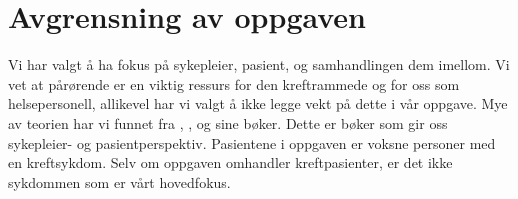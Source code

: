 \section{Avgrensning av oppgaven}

Vi har valgt å ha fokus på sykepleier, pasient, og samhandlingen dem imellom.
Vi vet at pårørende er en viktig ressurs for den kreftrammede og for oss som
helsepersonell, allikevel har vi valgt å ikke legge vekt på dette i vår
oppgave. Mye av teorien har vi funnet fra ,
,  og  sine bøker. Dette
er bøker som gir oss sykepleier- og pasientperspektiv. Pasientene i oppgaven er
voksne personer med en kreftsykdom.  Selv om oppgaven omhandler kreftpasienter,
er det ikke sykdommen som er vårt hovedfokus.
